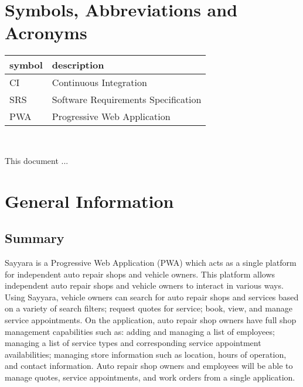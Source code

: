 \documentclass[12pt, titlepage]{article}
\begin{document}
\newpage

\tableofcontents

\listoftables
{}

\listoffigures
{}

\newpage

\section{Symbols, Abbreviations and Acronyms}

\renewcommand{\arraystretch}{1.2}
\begin{tabular}{l l}
	\toprule
	\textbf{symbol} & \textbf{description}                \\
	\midrule
	CI              & Continuous Integration              \\
	SRS             & Software Requirements Specification \\
	PWA             & Progressive Web Application         \\
	\bottomrule
\end{tabular}\\

\newpage


This document ... 

\section{General Information}

\subsection{Summary}

Sayyara is a Progressive Web Application (PWA) which acts as a single platform for independent auto
repair shops and vehicle owners. This platform allows independent auto repair shops and vehicle
owners to interact in various ways. Using Sayyara, vehicle owners can search for auto repair shops
and services based on a variety of search filters; request quotes for service; book, view, and
manage service appointments. On the application, auto repair shop owners have full shop management
capabilities such as: adding and managing a list of employees; managing a list of service types and
corresponding service appointment availabilities; managing store information such as location,
hours of operation, and contact information. Auto repair shop owners and employees will be able to
manage quotes, service appointments, and work orders from a single application.
\end{document}

